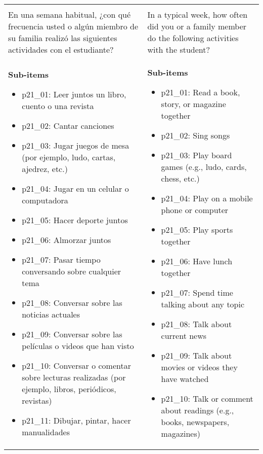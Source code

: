 \documentclass[11pt]{article}
\begin{document}
\begin{longtable}{@{}LL@{}}
\addlinespace[4pt]
 \\ 
En una semana habitual, ¿con qué frecuencia usted o algún miembro de su familia realizó las siguientes actividades con el estudiante? & In a typical week, how often did you or a family member do the following activities with the student? \\
\textbf{Sub-items}\par\begin{itemize}[leftmargin=*]\item p21\_01: Leer juntos un libro, cuento o una revista
\item p21\_02: Cantar canciones
\item p21\_03: Jugar juegos de mesa (por ejemplo, ludo, cartas, ajedrez, etc.)
\item p21\_04: Jugar en un celular o computadora
\item p21\_05: Hacer deporte juntos
\item p21\_06: Almorzar juntos
\item p21\_07: Pasar tiempo conversando sobre cualquier tema
\item p21\_08: Conversar sobre las noticias actuales
\item p21\_09: Conversar sobre las películas o videos que han visto
\item p21\_10: Conversar o comentar sobre lecturas realizadas (por ejemplo, libros, periódicos, revistas)
\item p21\_11: Dibujar, pintar, hacer manualidades\end{itemize} & \textbf{Sub-items}\par\begin{itemize}[leftmargin=*]\item p21\_01: Read a book, story, or magazine together
\item p21\_02: Sing songs
\item p21\_03: Play board games (e.g., ludo, cards, chess, etc.)
\item p21\_04: Play on a mobile phone or computer
\item p21\_05: Play sports together
\item p21\_06: Have lunch together
\item p21\_07: Spend time talking about any topic
\item p21\_08: Talk about current news
\item p21\_09: Talk about movies or videos they have watched
\item p21\_10: Talk or comment about readings (e.g., books, newspapers, magazines)

\end{itemize}
\end{longtable}
\end{document}
